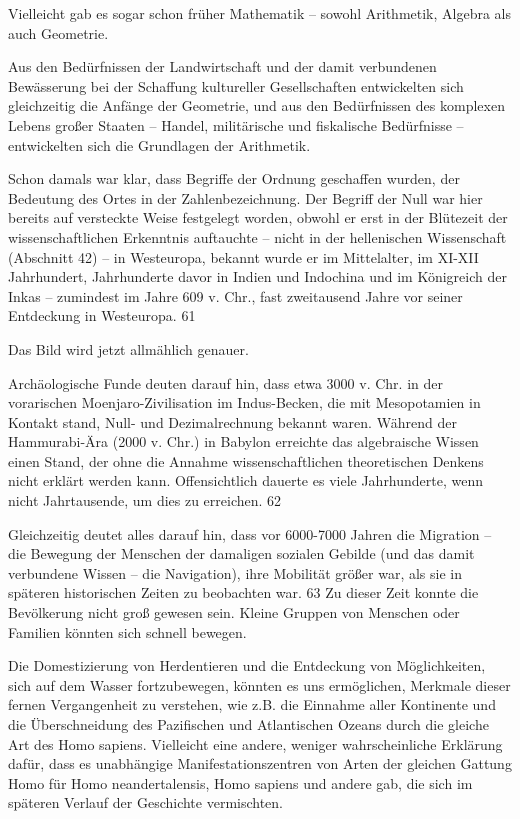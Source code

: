 \documentclass[11pt,a4paper]{book}
\begin{document}
Vielleicht gab es sogar schon früher Mathematik -- sowohl Arithmetik, Algebra als auch Geometrie. 

Aus den Bedürfnissen der Landwirtschaft und der damit verbundenen Bewässerung bei der Schaffung kultureller Gesellschaften entwickelten sich gleichzeitig die Anfänge der Geometrie, und aus den Bedürfnissen des komplexen Lebens großer Staaten -- Handel, militärische und fiskalische Bedürfnisse -- entwickelten sich die Grundlagen der Arithmetik. 

Schon damals war klar, dass Begriffe der Ordnung geschaffen wurden, der Bedeutung des Ortes in der Zahlenbezeichnung. Der Begriff der Null war hier bereits auf versteckte Weise festgelegt worden, obwohl er erst in der Blütezeit der wissenschaftlichen Erkenntnis auftauchte -- nicht in der hellenischen Wissenschaft (Abschnitt 42) -- in Westeuropa, bekannt wurde er im Mittelalter, im XI-XII Jahrhundert, Jahrhunderte davor in Indien und Indochina und im Königreich der Inkas -- zumindest im Jahre 609 v. Chr., fast zweitausend Jahre vor seiner Entdeckung in Westeuropa. 61 

Das Bild wird jetzt allmählich genauer. 

Archäologische Funde deuten darauf hin, dass etwa 3000 v. Chr. in der vorarischen Moenjaro-Zivilisation im Indus-Becken, die mit Mesopotamien in Kontakt stand, Null- und Dezimalrechnung bekannt waren. Während der Hammurabi-Ära (2000 v. Chr.) in Babylon erreichte das algebraische Wissen einen Stand, der ohne die Annahme wissenschaftlichen theoretischen Denkens nicht erklärt werden kann. Offensichtlich dauerte es viele Jahrhunderte, wenn nicht Jahrtausende, um dies zu erreichen. 62 

Gleichzeitig deutet alles darauf hin, dass vor 6000-7000 Jahren die Migration -- die Bewegung der Menschen der damaligen sozialen Gebilde (und das damit verbundene Wissen -- die Navigation), ihre Mobilität größer war, als sie in späteren historischen Zeiten zu beobachten war. 63 Zu dieser Zeit konnte die Bevölkerung nicht groß gewesen sein. Kleine Gruppen von Menschen oder Familien könnten sich schnell bewegen. 

Die Domestizierung von Herdentieren und die Entdeckung von Möglichkeiten, sich auf dem Wasser fortzubewegen, könnten es uns ermöglichen, Merkmale dieser fernen Vergangenheit zu verstehen, wie z.B. die Einnahme aller Kontinente und die Überschneidung des Pazifischen und Atlantischen Ozeans durch die gleiche Art des Homo sapiens. Vielleicht eine andere, weniger wahrscheinliche Erklärung dafür, dass es unabhängige Manifestationszentren von Arten der gleichen Gattung Homo für Homo neandertalensis, Homo sapiens und andere gab, die sich im späteren Verlauf der Geschichte vermischten. 
\end{document}
